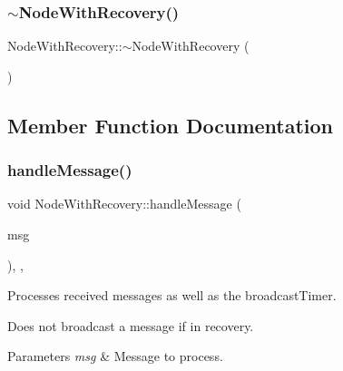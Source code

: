 \mbox{\label{class_node_with_recovery_a5cb1367a800cf960b96c9011ab94a616}} 
\subsubsection{\texorpdfstring{$\sim$\+Node\+With\+Recovery()}{~NodeWithRecovery()}}
{\footnotesize\ttfamily Node\+With\+Recovery\+::$\sim$\+Node\+With\+Recovery (\begin{DoxyParamCaption}{ }\end{DoxyParamCaption})\hspace{0.3cm}{\ttfamily [virtual]}}



\subsection{Member Function Documentation}
\mbox{\label{class_node_with_recovery_a901c89606b84898e13fe8a66228acd9f}} 
\subsubsection{\texorpdfstring{handle\+Message()}{handleMessage()}}
{\footnotesize\ttfamily void Node\+With\+Recovery\+::handle\+Message (\begin{DoxyParamCaption}\item[{c\+Message $\ast$}]{msg }\end{DoxyParamCaption})\hspace{0.3cm}{\ttfamily [override]}, {\ttfamily [protected]}, {\ttfamily [virtual]}}



Processes received messages as well as the broadcast\+Timer. 

Does not broadcast a message if in recovery. 
\begin{DoxyParams}{Parameters}
{\em msg} & Message to process. \\
\hline
\end{DoxyParams}


